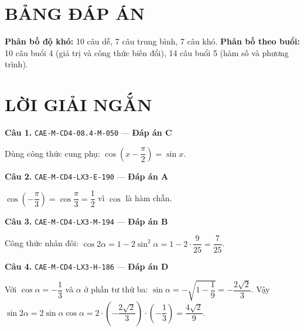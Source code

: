 \documentclass[11pt, a4paper]{article}
\begin{document}

\section{BẢNG ĐÁP ÁN}


\textbf{Phân bố độ khó:} 10 câu dễ, 7 câu trung bình, 7 câu khó.
\textbf{Phân bố theo buổi:} 10 câu buổi 4 (giá trị và công thức biến đổi), 14 câu buổi 5 (hàm số và phương trình).

\section{LỜI GIẢI NGẮN}

\textbf{Câu 1.} \texttt{CAE-M-CD4-08.4-M-050} — \textbf{Đáp án C}

Dùng công thức cung phụ: $\cos\left(x - \dfrac{\pi}{2}\right) = \sin x$.

\textbf{Câu 2.} \texttt{CAE-M-CD4-LX3-E-190} — \textbf{Đáp án A}

$\cos\left(-\dfrac{\pi}{3}\right) = \cos\dfrac{\pi}{3} = \dfrac{1}{2}$ vì $\cos$ là hàm chẵn.

\textbf{Câu 3.} \texttt{CAE-M-CD4-LX3-M-194} — \textbf{Đáp án B}

Công thức nhân đôi: $\cos 2\alpha = 1 - 2\sin^2\alpha = 1 - 2 \cdot \dfrac{9}{25} = \dfrac{7}{25}$.

\textbf{Câu 4.} \texttt{CAE-M-CD4-LX3-H-186} — \textbf{Đáp án D}

Với $\cos\alpha = -\dfrac{1}{3}$ và $\alpha$ ở phần tư thứ ba: $\sin\alpha = -\sqrt{1 - \dfrac{1}{9}} = -\dfrac{2\sqrt{2}}{3}$. Vậy $\sin 2\alpha = 2\sin\alpha\cos\alpha = 2 \cdot \left(-\dfrac{2\sqrt{2}}{3}\right) \cdot \left(-\dfrac{1}{3}\right) = \dfrac{4\sqrt{2}}{9}$.
\end{document}
